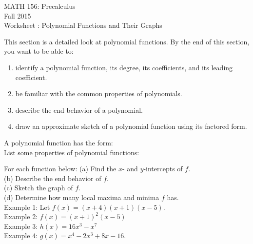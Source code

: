 \documentclass[11pt]{article}
\newcommand{\sect}{\textsection}
\begin{document}
 

\begin{center}MATH 156: Precalculus  \\ Fall 2015 \\ Worksheet \sect 3.2: Polynomial Functions and Their Graphs\end{center}

\hrulefill

This section is a detailed look at polynomial functions. By the end of this section, you want to be able to:
\begin{enumerate}
\item identify a polynomial function, its degree, its coefficients, and its leading coefficient.
\item be familiar with the common properties of polynomials.
\item describe the end behavior of a polynomial.
\item draw an approximate sketch of a polynomial function using its factored form.
\end{enumerate}

\hrulefill

A polynomial function has the form: \\

 
 List some properties of polynomial functions:
 
 \vspace{1in}

\hrulefill

For each function below: 
(a) Find the $x$- and $y$-intercepts of $f.$\\
(b) Describe the end behavior of $f.$\\
(c) Sketch the graph of $f.$\\
(d) Determine how many local maxima and minima $f$ has.\\

Example 1: Let $f(x)=(x+4)(x+1)(x-5).$ \\

\newpage
Example 2: $f(x)=(x+1)^2(x-5)$\\
\vfill
Example 3: $h(x)=16x^3-x^7$\\
\vfill
Example 4: $g(x)=x^4-2x^3+8x-16.$
\vfill

\newpage
\end{document}
